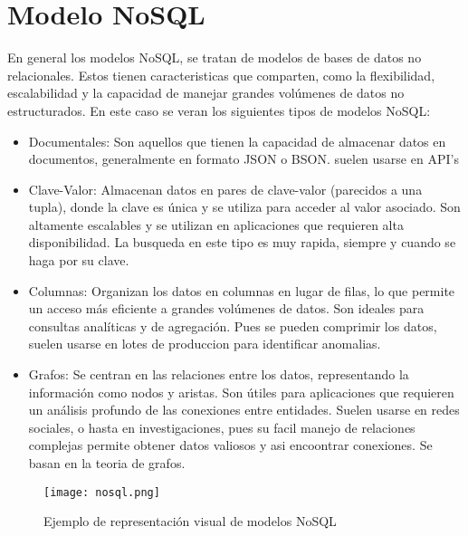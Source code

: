 \documentclass[12pt,a4paper]{article}
\begin{document}
\section*{Modelo NoSQL}
En general los modelos NoSQL, se tratan de modelos de bases de datos no relacionales. 
Estos tienen caracteristicas que comparten, como la flexibilidad, escalabilidad y la capacidad de manejar grandes volúmenes de datos no estructurados.
En este caso se veran los siguientes tipos de modelos NoSQL:\cite{gltaboadaNoSQL}
\begin{itemize}
    \item Documentales: Son aquellos que tienen la capacidad de almacenar datos en documentos, generalmente en formato JSON o BSON. suelen usarse en API's
    \item Clave-Valor: Almacenan datos en pares de clave-valor (parecidos a una tupla), donde la clave es única y se utiliza para acceder al valor asociado. Son altamente escalables y se utilizan en aplicaciones que requieren alta disponibilidad. La busqueda en este tipo es muy rapida, siempre y cuando se haga por su clave.
    \item Columnas: Organizan los datos en columnas en lugar de filas, lo que permite un acceso más eficiente a grandes volúmenes de datos. Son ideales para consultas analíticas y de agregación. Pues se pueden comprimir los datos, suelen usarse en lotes de produccion para identificar anomalias.
    \item Grafos: Se centran en las relaciones entre los datos, representando la información como nodos y aristas. Son útiles para aplicaciones que requieren un análisis profundo de las conexiones entre entidades. Suelen usarse en redes sociales, o hasta en investigaciones, pues su facil manejo de relaciones complejas permite obtener datos valiosos y asi encoontrar conexiones. Se basan en la teoria de grafos.
\end{itemize}

\begin{figure}[h!]
    \centering
    \texttt{[image: nosql.png]}
    \caption{Ejemplo de representación visual de modelos NoSQL}
    \label{fig:NoSQL}\cite{awsnosql}

\end{figure}
\vspace{0.5cm}
\printbibliography
\end{document}
